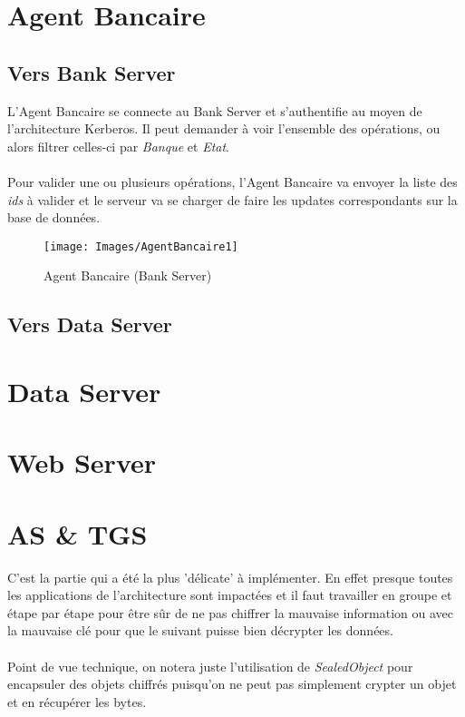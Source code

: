 \documentclass[11pt,fleqn]{article}
\begin{document}
\section{Agent Bancaire}
\subsection{Vers Bank Server}
L'Agent Bancaire se connecte au Bank Server et s'authentifie au moyen de l'architecture Kerberos. Il peut demander à voir l'ensemble des opérations, ou alors filtrer celles-ci par \emph{Banque} et \emph{Etat}.\\\\
Pour valider une ou plusieurs opérations, l'Agent Bancaire va envoyer la liste des \emph{ids} à valider et le serveur va se charger de faire les updates correspondants sur la base de données.
\begin{figure}[H]
	\texttt{[image: Images/AgentBancaire1]}
	\centering
	\caption{Agent Bancaire (Bank Server)}
\end{figure}
\subsection{Vers Data Server}
\section{Data Server}
\section{Web Server}
\section{AS \& TGS}
C'est la partie qui a été la plus 'délicate' à implémenter. En effet presque toutes les applications de l'architecture sont impactées et il faut travailler en groupe et étape par étape pour être sûr de ne pas chiffrer la mauvaise information ou avec la mauvaise clé pour que le suivant puisse bien décrypter les données.\\\\
Point de vue technique, on notera juste l'utilisation de \emph{SealedObject} pour encapsuler des objets chiffrés puisqu'on ne peut pas simplement crypter un objet et en récupérer les bytes.
\end{document}
